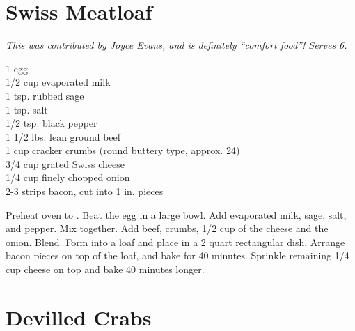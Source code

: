 \section{Swiss Meatloaf}
\label{sec:swiss-meatloaf}

\textit{This was contributed by Joyce Evans, and is definitely ``comfort
food''! Serves 6.}
\begin{ingredients}
1 egg \\
1/2 cup evaporated milk \\
1 tsp. rubbed sage \\
1 tsp. salt \\
1/2 tsp. black pepper \\
1 1/2 lbs. lean ground beef \\
1 cup cracker crumbs (round buttery type, approx. 24) \\
3/4 cup grated Swiss cheese \\
1/4 cup finely chopped onion \\
2-3 strips bacon, cut into 1 in. pieces \\
\end{ingredients}
Preheat oven to . Beat the egg in a large bowl. Add evaporated milk, 
sage, salt, and pepper.  Mix together. Add beef, crumbs, 1/2 cup of the cheese
and the onion. Blend. Form into a loaf and place in a 2 quart rectangular dish.
Arrange bacon pieces on top of the loaf, and bake for 40 minutes. Sprinkle
remaining 1/4 cup cheese on top and bake 40 minutes longer. 

\section{Devilled Crabs}

